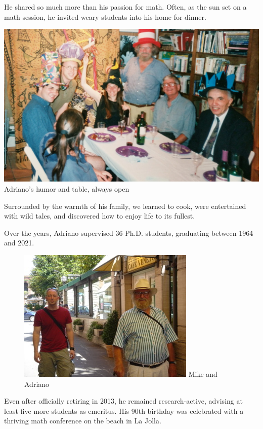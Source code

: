 \documentclass{notices}
\begin{document}
He shared so much more than his passion for math.
Often, as the sun set on a math session, he invited weary students into his home for dinner. 
\begin{center}
    \includegraphics[width=.99\linewidth]{mealhat.jpg}
{\footnotesize Adriano's humor and table, always open}
\end{center}
Surrounded by the warmth of his family, 
we learned to cook, 
were entertained with wild tales, and discovered how to enjoy life to its fullest.

Over the years, Adriano supervised 36 Ph.D. students, graduating between 1964 and 2021. 
  \begin{figure}
    \centering
    \includegraphics[width=.93\linewidth]{mike.jpeg}
 {\footnotesize Mike and Adriano}
\end{figure}
Even after officially retiring
in 2013, he remained research-active, advising at least five more students as emeritus. 
His 90th birthday was celebrated with 
a thriving math conference on the beach in La Jolla.
\end{document}
